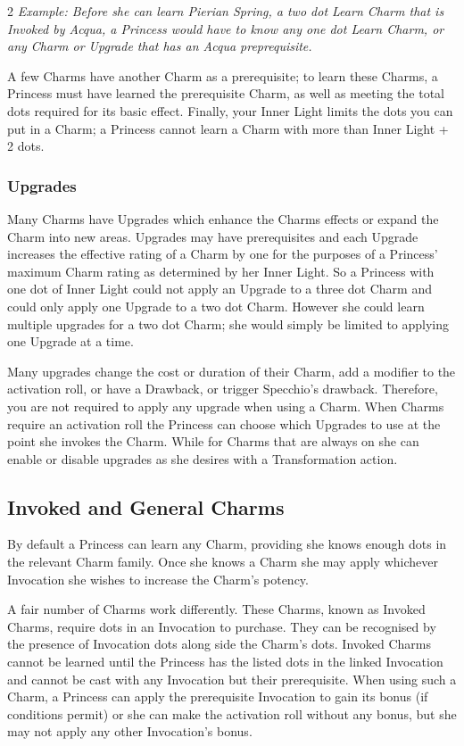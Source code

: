 \begin{multicols}{2}
\textit{Example: Before she can learn Pierian Spring, a two dot Learn Charm that is Invoked by Acqua, a Princess would have to know any one dot Learn Charm, or any Charm or Upgrade that has an Acqua preprequisite.}

A few Charms have another Charm as a prerequisite; to learn these Charms, a Princess must have learned the prerequisite Charm, as well as meeting the total dots required for its basic effect. Finally, your Inner Light limits the dots you can put in a Charm; a Princess cannot learn a Charm with more than Inner Light + 2 dots. 

\subsubsection*{Upgrades}

Many Charms have Upgrades which enhance the Charms effects or expand the Charm into new areas. Upgrades may have prerequisites and each Upgrade increases the effective rating of a Charm by one for the purposes of a Princess' maximum Charm rating as determined by her Inner Light. So a Princess with one dot of Inner Light could not apply an Upgrade to a three dot Charm and could only apply one Upgrade to a two dot Charm. However she could learn multiple upgrades for a two dot Charm; she would simply be limited to applying one Upgrade at a time. 

Many upgrades change the cost or duration of their Charm, add a modifier to the activation roll, or have a Drawback, or trigger Specchio's drawback. Therefore, you are not required to apply any upgrade when using a Charm. When Charms require an activation roll the Princess can choose which Upgrades to use at the point she invokes the Charm. While for Charms that are always on she can enable or disable upgrades as she desires with a Transformation action.

\subsection*{Invoked and General Charms}

By default a Princess can learn any Charm, providing she knows enough dots in the relevant Charm family. Once she knows a Charm she may apply whichever Invocation she wishes to increase the Charm's potency. 

A fair number of Charms work differently. These Charms, known as Invoked Charms, require dots in an Invocation to purchase. They can be recognised by the presence of Invocation dots along side the Charm's dots. Invoked Charms cannot be learned until the Princess has the listed dots in the linked Invocation and cannot be cast with any Invocation but their prerequisite. When using such a Charm, a Princess can apply the prerequisite Invocation to gain its bonus (if conditions permit) or she can make the activation roll without any bonus, but she may not apply any other Invocation's bonus. 


\end{multicols}
